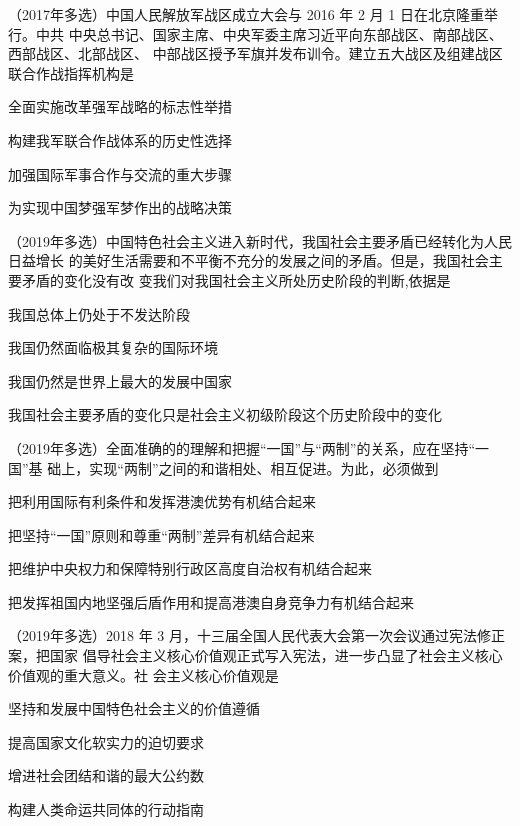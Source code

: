 \documentclass[lang=cn,newtx,10pt,scheme=chinese,pad,twocol]{zznote}
\begin{document}
\begin{example}	（2017年多选）中国人民解放军战区成立大会与 2016 年 2 月 1 日在北京隆重举行。中共
	中央总书记、国家主席、中央军委主席习近平向东部战区、南部战区、西部战区、北部战区、
	中部战区授予军旗并发布训令。建立五大战区及组建战区联合作战指挥机构是
	\begin{choice}
		\item 全面实施改革强军战略的标志性举措
		\item 构建我军联合作战体系的历史性选择
		\item 加强国际军事合作与交流的重大步骤
		\item 为实现中国梦强军梦作出的战略决策
	\end{choice}
\end{example}

\begin{example}	（2019年多选）中国特色社会主义进入新时代，我国社会主要矛盾已经转化为人民日益增长
	的美好生活需要和不平衡不充分的发展之间的矛盾。但是，我国社会主要矛盾的变化没有改
	变我们对我国社会主义所处历史阶段的判断,依据是
	\begin{choice}
		\item 我国总体上仍处于不发达阶段
		\item 我国仍然面临极其复杂的国际环境
		\item 我国仍然是世界上最大的发展中国家
		\item 我国社会主要矛盾的变化只是社会主义初级阶段这个历史阶段中的变化
	\end{choice}
\end{example}

\begin{example}	（2019年多选）全面准确的的理解和把握“一国”与“两制”的关系，应在坚持“一国”基
	础上，实现“两制”之间的和谐相处、相互促进。为此，必须做到
	\begin{choice}
		\item 把利用国际有利条件和发挥港澳优势有机结合起来
		\item 把坚持“一国”原则和尊重“两制”差异有机结合起来
		\item 把维护中央权力和保障特别行政区高度自治权有机结合起来
		\item 把发挥祖国内地坚强后盾作用和提高港澳自身竞争力有机结合起来
	\end{choice}
\end{example}


\begin{example}	（2019年多选）2018 年 3 月，十三届全国人民代表大会第一次会议通过宪法修正案，把国家
	倡导社会主义核心价值观正式写入宪法，进一步凸显了社会主义核心价值观的重大意义。社
	会主义核心价值观是
	\begin{choice}
		\item 坚持和发展中国特色社会主义的价值遵循
		\item 提高国家文化软实力的迫切要求
		\item 增进社会团结和谐的最大公约数
		\item 构建人类命运共同体的行动指南
	\end{choice}
\end{example}
\end{document}
